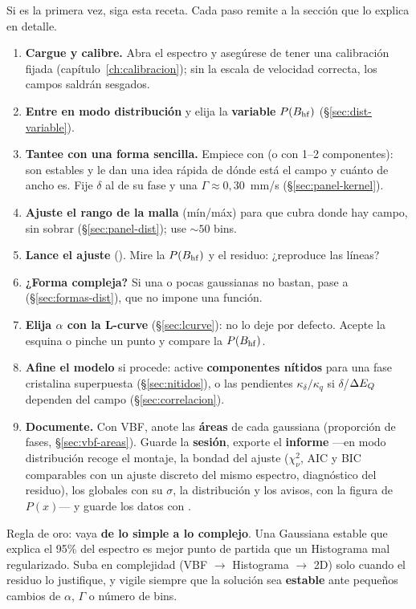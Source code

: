 Si es la primera vez, siga esta receta. Cada paso remite a la sección que lo
explica en detalle.

\begin{enumerate}[nosep]
  \item \textbf{Cargue y calibre.} Abra el espectro y asegúrese de tener una
        calibración fijada (capítulo~\ref{ch:calibracion}); sin la escala de
        velocidad correcta, los campos saldrán sesgados.
  \item \textbf{Entre en modo distribución} y elija la \textbf{variable}
        $P(B_{\mathrm{hf}})$ (§\ref{sec:dist-variable}).
  \item \textbf{Tantee con una forma sencilla.} Empiece con  (o
         con 1--2 componentes): son estables y le dan una idea rápida de
        dónde está el campo y cuánto de ancho es. Fije $\delta$ al de su fase y una
        $\Gamma \approx 0{,}30$~mm/s (§\ref{sec:panel-kernel}).
  \item \textbf{Ajuste el rango de la malla} (mín/máx) para que cubra donde hay
        campo, sin sobrar (§\ref{sec:panel-dist}); use $\sim 50$ bins.
  \item \textbf{Lance el ajuste} (). Mire la $P(B_{\mathrm{hf}})$ y el
        residuo: ¿reproduce las líneas?
  \item \textbf{¿Forma compleja?} Si una o pocas gaussianas no bastan, pase a
         (§\ref{sec:formas-dist}), que no impone una función.
  \item \textbf{Elija $\alpha$ con la L-curve} (§\ref{sec:lcurve}): no lo deje por
        defecto. Acepte la esquina o pinche un punto y compare la $P(B_{\mathrm{hf}})$.
  \item \textbf{Afine el modelo} si procede: active \textbf{componentes nítidos}
        para una fase cristalina superpuesta (§\ref{sec:nitidos}), o las
        pendientes $\kappa_\delta/\kappa_q$ si $\delta$/$\Delta E_{Q}$ dependen del campo
        (§\ref{sec:correlacion}).
  \item \textbf{Documente.} Con VBF, anote las \textbf{áreas} de cada gaussiana
        (proporción de fases, §\ref{sec:vbf-areas}). Guarde la \textbf{sesión},
        exporte el \textbf{informe} —en modo distribución recoge el montaje, la
        bondad del ajuste ($\chi^2_\nu$, AIC y BIC comparables con un ajuste
        discreto del mismo espectro, diagnóstico del residuo), los globales con
        su $\sigma$, la distribución y los avisos, con la figura de $P(x)$— y
        guarde los datos con .
\end{enumerate}

\begin{truco}
Regla de oro: vaya \textbf{de lo simple a lo complejo}. Una Gaussiana estable que
explica el 95\% del espectro es mejor punto de partida que un Histograma mal
regularizado. Suba en complejidad (VBF $\to$ Histograma $\to$ 2D) solo cuando el
residuo lo justifique, y vigile siempre que la solución sea \textbf{estable} ante
pequeños cambios de $\alpha$, $\Gamma$ o número de bins.
\end{truco}

